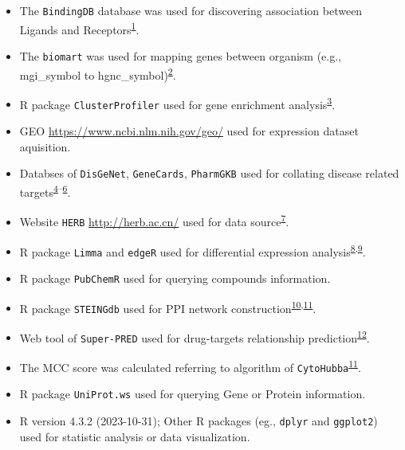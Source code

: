 \documentclass[
]{article}
\providecommand{\tightlist}{%
  \setlength{\itemsep}{0pt}\setlength{\parskip}{0pt}}
\begin{document}
\begin{itemize}
\tightlist
\item
  The \texttt{BindingDB} database was used for discovering association between Ligands and Receptors\textsuperscript{\protect\hyperlink{ref-BindingdbIn20Gilson2016}{1}}.
\item
  The \texttt{biomart} was used for mapping genes between organism (e.g., mgi\_symbol to hgnc\_symbol)\textsuperscript{\protect\hyperlink{ref-MappingIdentifDurinc2009}{2}}.
\item
  R package \texttt{ClusterProfiler} used for gene enrichment analysis\textsuperscript{\protect\hyperlink{ref-ClusterprofilerWuTi2021}{3}}.
\item
  GEO \url{https://www.ncbi.nlm.nih.gov/geo/} used for expression dataset aquisition.
\item
  Databses of \texttt{DisGeNet}, \texttt{GeneCards}, \texttt{PharmGKB} used for collating disease related targets\textsuperscript{\protect\hyperlink{ref-TheDisgenetKnPinero2019}{4}--\protect\hyperlink{ref-PharmgkbAWorBarbar2018}{6}}.
\item
  Website \texttt{HERB} \url{http://herb.ac.cn/} used for data source\textsuperscript{\protect\hyperlink{ref-HerbAHighThFang2021}{7}}.
\item
  R package \texttt{Limma} and \texttt{edgeR} used for differential expression analysis\textsuperscript{\protect\hyperlink{ref-LimmaPowersDiRitchi2015}{8},\protect\hyperlink{ref-EdgerDifferenChen}{9}}.
\item
  R package \texttt{PubChemR} used for querying compounds information.
\item
  R package \texttt{STEINGdb} used for PPI network construction\textsuperscript{\protect\hyperlink{ref-TheStringDataSzklar2021}{10},\protect\hyperlink{ref-CytohubbaIdenChin2014}{11}}.
\item
  Web tool of \texttt{Super-PRED} used for drug-targets relationship prediction\textsuperscript{\protect\hyperlink{ref-SuperpredUpdaNickel2014}{12}}.
\item
  The MCC score was calculated referring to algorithm of \texttt{CytoHubba}\textsuperscript{\protect\hyperlink{ref-CytohubbaIdenChin2014}{11}}.
\item
  R package \texttt{UniProt.ws} used for querying Gene or Protein information.
\item
  R version 4.3.2 (2023-10-31); Other R packages (eg., \texttt{dplyr} and \texttt{ggplot2}) used for statistic analysis or data visualization.
\end{itemize}
\end{document}
